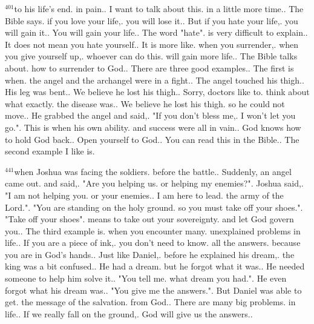 \documentclass{book}
\begin{document}
$^{401}$to his life's end.
in pain..
I want to talk about this.
in a little more time..
The Bible says.
if you love your life,.
you will lose it..
But if you hate your life,.
you will gain it..
You will gain your life..
The word "hate".
is very difficult to explain..
It does not mean you hate yourself..
It is more like.
when you surrender,.
when you give yourself up,.
whoever can do this.
will gain more life..
The Bible talks about.
how to surrender to God..
There are three good examples..
The first is when.
the angel and the archangel were in a fight..
The angel touched his thigh..
His leg was bent..
We believe he lost his thigh..
Sorry, doctors like to.
think about what exactly.
the disease was..
We believe he lost his thigh.
so he could not move..
He grabbed the angel and said,.
"If you don't bless me,.
I won't let you go.".
This is when his own ability.
and success were all in vain..
God knows how to hold God back..
Open yourself to God..
You can read this in the Bible..
The second example I like is.

$^{441}$when Joshua was facing the soldiers.
before the battle..
Suddenly, an angel came out.
and said,.
"Are you helping us.
or helping my enemies?".
Joshua said,.
"I am not helping you.
or your enemies..
I am here to lead.
the army of the Lord.".
"You are standing on the holy ground.
so you must take off your shoes.".
"Take off your shoes".
means to take out your sovereignty.
and let God govern you..
The third example is.
when you encounter many.
unexplained problems in life..
If you are a piece of ink,.
you don't need to know.
all the answers.
because you are in God's hands..
Just like Daniel,.
before he explained his dream,.
the king was a bit confused..
He had a dream.
but he forgot what it was..
He needed someone to help him solve it..
"You tell me.
what dream you had.".
He even forgot what his dream was..
"You give me the answers.".
But Daniel was able to get.
the message of the salvation.
from God..
There are many big problems.
in life..
If we really fall on the ground,.
God will give us the answers..
\end{document}
